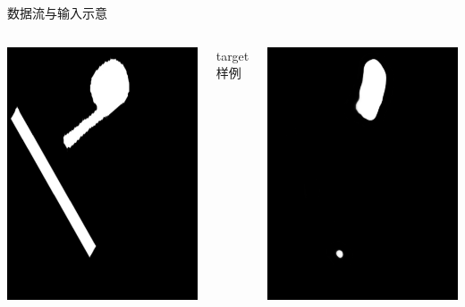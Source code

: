 \documentclass{beamer}
\begin{document}
\begin{frame}{数据流与输入示意}
\begin{columns}
\includegraphics[width=0.95\linewidth]{results/target_0.png}
\centerline{\small target样例}
\includegraphics[width=0.95\linewidth]{results/pred_0.png}

\end{columns}
\end{frame}
\end{document}
